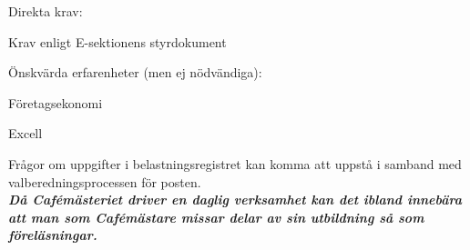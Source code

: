 \documentclass[10pt]{article}
\begin{document}
Direkta krav:
\begin{dashlist}
    \item Krav enligt E-sektionens styrdokument
\end{dashlist}


Önskvärda erfarenheter (men ej nödvändiga):
\begin{dashlist}
    \item Företagsekonomi
    \item Excell
\end{dashlist}

Frågor om uppgifter i belastningsregistret kan komma att uppstå i samband med valberedningsprocessen för posten.\\

\textbf{\textit{Då Cafémästeriet driver en daglig verksamhet kan det ibland innebära att man som Cafémästare missar delar av sin utbildning så som föreläsningar.}}
\end{document}
